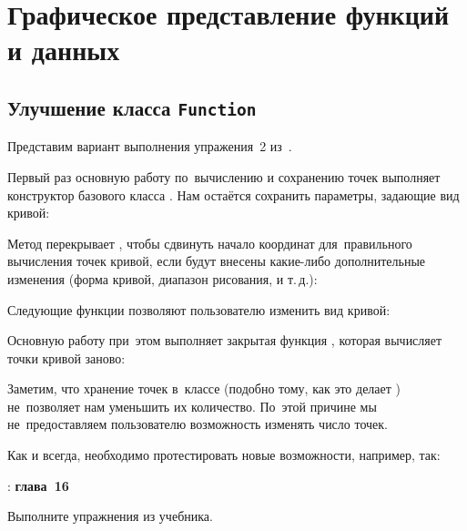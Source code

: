 
\chapter{Графическое представление функций и данных}

\section{Улучшение класса \texttt{Function}}
Представим вариант выполнения упражения~2 из~.


Первый раз основную работу по~вычислению и сохранению точек выполняет конструктор базового класса . Нам остаётся сохранить параметры, задающие вид кривой:


Метод  перекрывает , чтобы сдвинуть начало координат для~правильного вычисления точек кривой, если будут внесены какие-либо дополнительные изменения (форма кривой, диапазон рисования, и т.\,д.):


Следующие функции позволяют пользователю изменить вид кривой:


Основную работу при~этом выполняет закрытая функция , которая вычисляет точки кривой заново:


Заметим, что хранение точек в~классе  (подобно тому, как это делает \-) не~позволяет нам уменьшить их количество. По~этой причине мы не~предоставляем пользователю возможность изменять число точек.

Как и всегда, необходимо протестировать новые возможности, например, так:








\WhatToReadSection
\textcite{Stroustrup:2016:ru}: \textbf{глава~16}



\ExercisesSection
\begin{exercise}
\item Выполните упражнения из  учебника.

\end{exercise}
